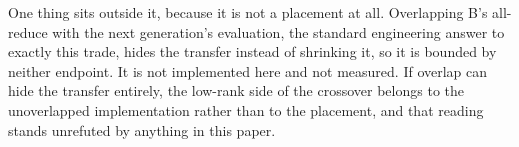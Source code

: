 One thing sits outside it, because it is not a placement at all. Overlapping
B's all-reduce with the next generation's evaluation, the standard
engineering answer to exactly this trade, hides the transfer instead of
shrinking it, so it is bounded by neither endpoint. It is not implemented
here and not measured. If overlap can hide the transfer entirely, the
low-rank side of the crossover belongs to the unoverlapped implementation
rather than to the placement, and that reading stands unrefuted by anything
in this paper.
